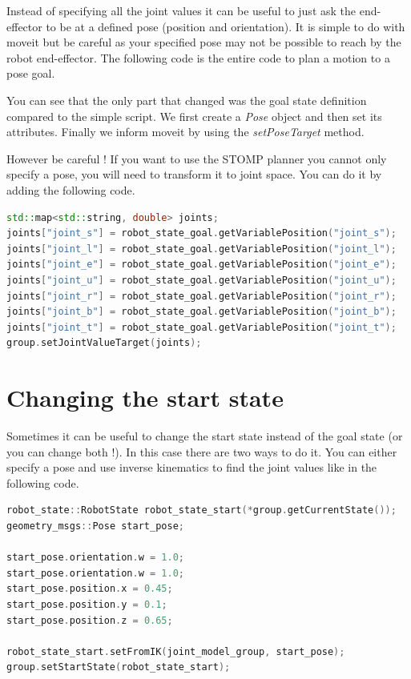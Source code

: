 Instead of specifying all the joint values it can be useful to just ask the end-effector to be at a defined pose (position and orientation). It is simple to do with moveit but be careful as your specified pose may not be possible to reach by the robot end-effector. The following code is the entire code to plan a motion to a pose goal.



You can see that the only part that changed was the goal state definition compared to the simple script. We first create a \emph{Pose} object and then set its attributes. Finally we inform moveit by using the \emph{setPoseTarget} method. 

However be careful ! If you want to use the STOMP planner you cannot only specify a pose, you will need to transform it to joint space. You can do it by adding the following code.

\begin{lstlisting}[language=c++]
std::map<std::string, double> joints;
joints["joint_s"] = robot_state_goal.getVariablePosition("joint_s");
joints["joint_l"] = robot_state_goal.getVariablePosition("joint_l");
joints["joint_e"] = robot_state_goal.getVariablePosition("joint_e");
joints["joint_u"] = robot_state_goal.getVariablePosition("joint_u");
joints["joint_r"] = robot_state_goal.getVariablePosition("joint_r");
joints["joint_b"] = robot_state_goal.getVariablePosition("joint_b");
joints["joint_t"] = robot_state_goal.getVariablePosition("joint_t");
group.setJointValueTarget(joints);
\end{lstlisting}

\section{Changing the start state}
Sometimes it can be useful to change the start state instead of the goal state (or you can change both !). In this case there are two ways to do it. You can either specify a pose and use inverse kinematics to find the joint values like in the following code.
 

\begin{lstlisting}[language=c++]
robot_state::RobotState robot_state_start(*group.getCurrentState());
geometry_msgs::Pose start_pose;
  
start_pose.orientation.w = 1.0; 
start_pose.orientation.w = 1.0;
start_pose.position.x = 0.45;
start_pose.position.y = 0.1;
start_pose.position.z = 0.65;
  
robot_state_start.setFromIK(joint_model_group, start_pose);
group.setStartState(robot_state_start);
\end{lstlisting}

